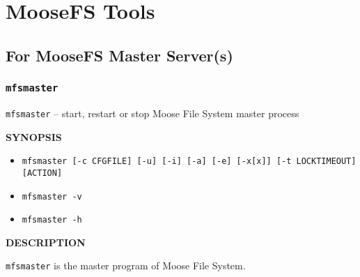 \documentclass[a4paper,11pt,english]{report}
\def\code#1{\texttt{#1}}
\begin{document}
	\chapter{MooseFS Tools}
	
		\section{For MooseFS Master Server(s)}
		
			\subsection{\code{mfsmaster}}
				\code{mfsmaster} -- start, restart or stop Moose File System master process
				\bigskip
				
				\textbf{SYNOPSIS}
				\begin{itemize}
					\item \code{mfsmaster [-c CFGFILE] [-u] [-i] [-a] [-e] [-x[x]] [-t LOCKTIMEOUT] [ACTION]}
					\item \code{mfsmaster -v}
					\item \code{mfsmaster -h}
				\end{itemize}
				
				\bigskip
				\textbf{DESCRIPTION}
				
				\code{mfsmaster} is the master program of Moose File System.
				
				\bigskip
				
\end{document}
